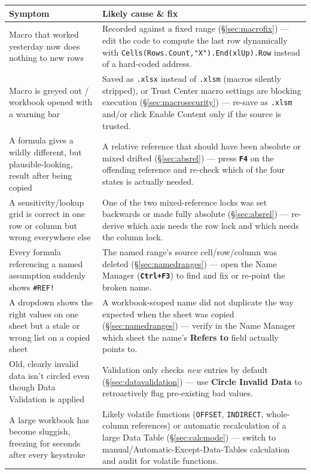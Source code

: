 \documentclass[11pt,a4paper]{article}
\newcommand{\key}[1]{\texttt{\colorbox{black!8}{\textbf{#1}}}}
\begin{document}
\begin{center}
\begin{tabular}{@{}L{3.8cm}L{8.2cm}@{}}
\toprule
\textbf{Symptom} & \textbf{Likely cause \& fix} \\
\midrule
Macro that worked yesterday now does nothing to new rows & Recorded against a fixed range (\S\ref{sec:macrofix}) --- edit the code to compute the last row dynamically with \texttt{Cells(Rows.Count,\allowbreak"X").\allowbreak End(xlUp).\allowbreak Row} instead of a hard-coded address. \\
Macro is greyed out / workbook opened with a warning bar & Saved as \texttt{.xlsx} instead of \texttt{.xlsm} (macros silently stripped), or Trust Center macro settings are blocking execution (\S\ref{sec:macrosecurity}) --- re-save as \texttt{.xlsm} and/or click Enable Content only if the source is trusted. \\
A formula gives a wildly different, but plausible-looking, result after being copied & A relative reference that should have been absolute or mixed drifted (\S\ref{sec:absrel}) --- press \key{F4} on the offending reference and re-check which of the four states is actually needed. \\
A sensitivity/lookup grid is correct in one row or column but wrong everywhere else & One of the two mixed-reference locks was set backwards or made fully absolute (\S\ref{sec:absrel}) --- re-derive which axis needs the row lock and which needs the column lock. \\
Every formula referencing a named assumption suddenly shows \texttt{\#REF!} & The named range's source cell/row/column was deleted (\S\ref{sec:namedranges}) --- open the Name Manager (\key{Ctrl+F3}) to find and fix or re-point the broken name. \\
A dropdown shows the right values on one sheet but a stale or wrong list on a copied sheet & A workbook-scoped name did not duplicate the way expected when the sheet was copied (\S\ref{sec:namedranges}) --- verify in the Name Manager which sheet the name's \textbf{Refers to} field actually points to. \\
Old, clearly invalid data isn't circled even though Data Validation is applied & Validation only checks \emph{new} entries by default (\S\ref{sec:datavalidation}) --- use \textbf{Circle Invalid Data} to retroactively flag pre-existing bad values. \\
A large workbook has become sluggish, freezing for seconds after every keystroke & Likely volatile functions (\texttt{OFFSET}, \texttt{INDIRECT}, whole-column references) or automatic recalculation of a large Data Table (\S\ref{sec:calcmode}) --- switch to manual/Automatic-Except-Data-Tables calculation and audit for volatile functions. \\
\bottomrule
\end{tabular}
\end{center}
\end{document}
